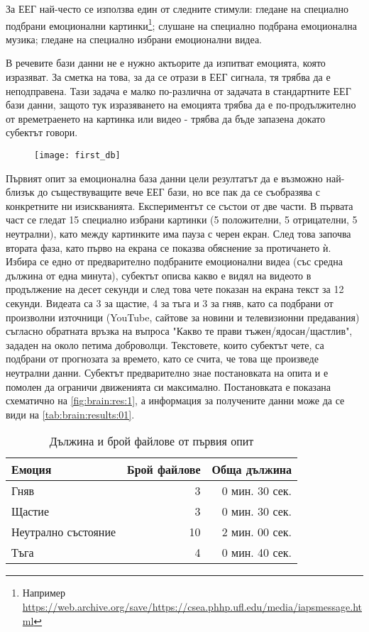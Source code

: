 \documentclass[main.tex]{subfiles}
\begin{document}
За ЕЕГ най-често се използва един от следните стимули: гледане на специално подбрани емоционални картинки\footnote{Например \url{https://web.archive.org/save/https://csea.phhp.ufl.edu/media/iapsmessage.html}}; слушане на специално подбрана емоционална музика; гледане на специално избрани емоционални видеа.

В речевите бази данни не е нужно актьорите да изпитват емоцията, която изразяват. За сметка на това, за да се отрази в ЕЕГ сигнала, тя трябва да е неподправена. Тази задача е малко по-различна от задачата в стандартните ЕЕГ бази данни, защото тук изразяването на емоцията трябва да е по-продължително от времетраенето на картинка или видео - трябва да бъде запазена докато субектът говори.

\begin{figure}[ht]%
    \texttt{[image: first\_db]}%
    \caption{}
    \label{fig:brain:res:1}
\end{figure}

Първият опит за емоционална база данни цели резултатът да е възможно най-близък до съществуващите вече ЕЕГ бази, но все пак да се съобразява с конкретните ни изискванията. Експериментът се състои от две части.
В първата част се гледат 15 специално избрани картинки (5 положителни, 5 отрицателни, 5 неутрални), като между картинките има пауза с черен екран. След това започва втората фаза, като първо на екрана се показва обяснение за протичането ѝ. Избира се едно от предварително подбраните емоционални видеа (със средна дължина от една минута), субектът описва какво е видял на видеото в продължение на десет секунди и след това чете показан на екрана текст за 12 секунди.
Видеата са 3 за щастие, 4 за тъга и 3 за гняв, като са подбрани от произволни източници (YouTube, сайтове за новини и телевизионни предавания) съгласно обратната връзка на въпроса "Какво те прави тъжен/ядосан/щастлив", зададен на около петима доброволци. Текстовете, които субектът чете, са подбрани от прогнозата за времето, като се счита, че това ще произведе неутрални данни.
Субектът предварително знае постановката на опита и е помолен да ограничи движенията си максимално. Постановката е показана схематично на \autoref{fig:brain:res:1}, а информация за получените данни може да се види на \autoref{tab:brain:results:01}.

\begin{table}[h]
    \begin{center}
    \begin{tabular}{|l|r|r|} 
        \hline
        Емоция & Брой файлове & Обща дължина\\ 
        \hline
        Гняв & 3 & 0 мин. 30 сек.\\ 
        Щастие & 3 & 0 мин. 30 сек.\\ 
        Неутрално състояние & 10 & 2 мин. 00 сек. \\ 
        Тъга & 4 & 0 мин. 40 сек. \\ 
        \hline
    \end{tabular}
    \caption{Дължина и брой файлове от първия опит}
    \label{tab:brain:results:01}
    \end{center}
\end{table}
\end{document}
